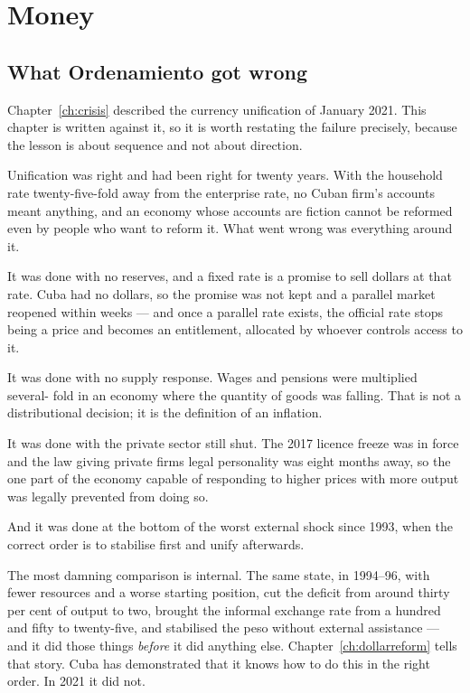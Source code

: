 \chapter{Money}
\label{ch:money}

\section{What Ordenamiento got wrong}

Chapter~\ref{ch:crisis} described the currency unification of January 2021. This
chapter is written against it, so it is worth restating the failure precisely,
because the lesson is about sequence and not about direction.

Unification was right and had been right for twenty years. With the household
rate twenty-five-fold away from the enterprise rate, no Cuban firm's accounts
meant anything, and an economy whose accounts are fiction cannot be reformed
even by people who want to reform it. What went wrong was everything around it.

It was done with no reserves, and a fixed rate is a promise to sell dollars at
that rate. Cuba had no dollars, so the promise was not kept and a parallel market
reopened within weeks --- and once a parallel rate exists, the official rate
stops being a price and becomes an entitlement, allocated by whoever controls
access to it.

It was done with no supply response. Wages and pensions were multiplied several-
fold in an economy where the quantity of goods was falling. That is not a
distributional decision; it is the definition of an inflation.

It was done with the private sector still shut. The 2017 licence freeze was in
force and the law giving private firms legal personality was eight months away,
so the one part of the economy capable of responding to higher prices with more
output was legally prevented from doing so.

And it was done at the bottom of the worst external shock since 1993, when the
correct order is to stabilise first and unify afterwards.

The most damning comparison is internal. The same state, in 1994--96, with
fewer resources and a worse starting position, cut the deficit from around
thirty per cent of output to two, brought the informal exchange rate from a
hundred and fifty to twenty-five, and stabilised the peso without external
assistance --- and it did those things \emph{before} it did anything else.
Chapter~\ref{ch:dollarreform} tells that story. Cuba has demonstrated that it
knows how to do this in the right order. In 2021 it did not.

